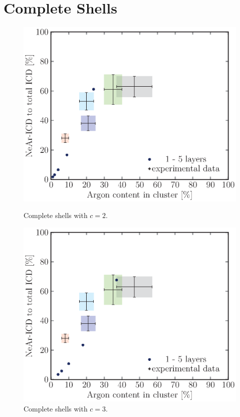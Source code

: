 \section{Complete Shells}
\begin{figure}[!h]
\begin{minipage}{0.48\textwidth}
    \centering
    \includegraphics[scale=0.5]{pics/compl02.ps}
    \caption{Complete shells with $c=2$.}
    \label{compl02}
\end{minipage}
\hfill
\begin{minipage}{0.48\textwidth}
    \centering
    \includegraphics[scale=0.5]{pics/compl03.ps}
    \caption{Complete shells with $c=3$.}
    \label{compl03}
\end{minipage}
\end{figure}


